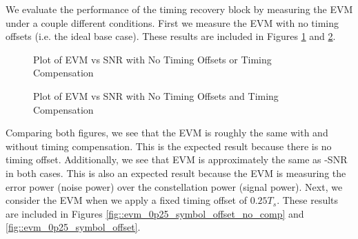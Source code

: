 \documentclass{article}
\begin{document}
We evaluate the performance of the timing recovery block by measuring the EVM under a couple different conditions. First we measure the EVM with no timing offsets (i.e. the ideal base case). These results are included in Figures \ref{fig::evm_no_timing_offset_no_comp} and \ref{fig::evm_no_timing_offset}.

\begin{figure}[H]
	\centerline{}
	\caption{Plot of EVM vs SNR with No Timing Offsets or Timing Compensation}
	\label{fig::evm_no_timing_offset_no_comp}
\end{figure}

\begin{figure}[H]
	\centerline{}
	\caption{Plot of EVM vs SNR with No Timing Offsets and Timing Compensation}
	\label{fig::evm_no_timing_offset}
\end{figure}

Comparing both figures, we see that the EVM is roughly the same with and without timing compensation. This is the expected result because there is no timing offset. Additionally, we see that EVM is approximately the same as -SNR in both cases. This is also an expected result because the EVM is measuring the error power (noise power) over the constellation power (signal power). Next, we consider the EVM when we apply a fixed timing offset of $0.25T_s$. These results are included in Figures \ref{fig::evm_0p25_symbol_offset_no_comp} and \ref{fig::evm_0p25_symbol_offset}.
\end{document}
